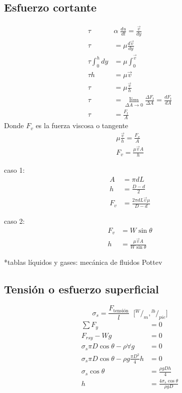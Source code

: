 \subsection{Esfuerzo cortante}
\[
    \begin{split}
        \tau \; & \alpha \; \frac{ du }{ dt } = \frac{ \Vec{v} }{ dy } \\
        \tau & = \mu \frac{ d\Vec{ v } }{ dy } \\
        \tau \int_{ 0 }^{ h }dy & = \mu \int_{ 0 }^{ \Vec{v} } \\
        \tau h & = \mu \Vec{ v } \\
        \tau & = \mu \frac{ \Vec{ v } }{ h } \\
        \tau & = \lim_{\Delta A \to 0} \frac{ \Delta F_{t} }{ \Delta A } = \frac{ dF_{t} }{ dA } \\
        \tau & = \frac{ F_{t} }{ A }
    \end{split}
\]
Donde \( F_{v} \) es la fuerza viscosa o tangente
\[
    \begin{split}
        \mu \frac{ \Vec{v} }{ h } = \frac{ F_{v} }{ A }\\
        F_{v} = \frac{ \mu \Vec{v} A }{ h }    
    \end{split}
\]

caso 1: 
\[
    \begin{split}
        A & = \pi d L \\
        h & = \frac{ D - d }{ 2 } \\
        F_{v} & = \frac{ 2 \pi d L \Vec{v} \mu }{ D - d }
    \end{split}
\]

caso 2:
\[
    \begin{split}
        F_{v} & = W \sin{ \theta } \\
        h & = \frac{ \mu \Vec{v} A }{ W \sin{ \theta } }
    \end{split}
\]

*tablas líquidos y gases: mecánica de fluidos Pottev

\subsection{Tensión o esfuerzo superficial} 
\[
    \sigma_{s} = \frac{ F_{ \text{tensión} } }{ l } \;\; \Big[ {}^{ W }/_{ m }, {}^{ lb }/_{ pie } \Big]
\]
\[ 
    \begin{split}
        \sum F_{y} & = 0 \\
        F_{rsy} - Wg & = 0 \\
        \sigma_{s} \pi D \cos{ \theta } - \rho \forall g & = 0 \\
        \sigma_{s} \pi D \cos{ \theta } - \rho g \frac{ \pi D^{2} }{ 4 } h & = 0 \\
        \sigma_{s} \cos{ \theta } & = \frac{ \rho g D h }{ 4 } \\
        h & = \frac{ 4 \sigma_{s} \cos{ \theta } }{ \rho g D }
    \end{split}
\]